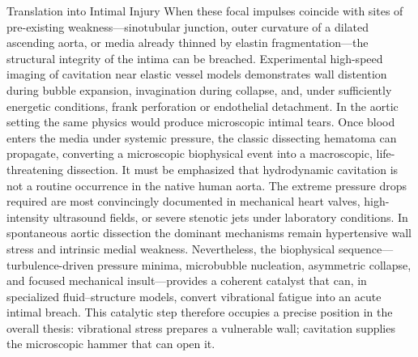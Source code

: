 Translation into Intimal Injury
When these focal impulses coincide with sites of pre-existing weakness—sinotubular junction, outer curvature of a dilated ascending aorta, or media already thinned by elastin fragmentation—the structural integrity of the intima can be breached. Experimental high-speed imaging of cavitation near elastic vessel models demonstrates wall distention during bubble expansion, invagination during collapse, and, under sufficiently energetic conditions, frank perforation or endothelial detachment. In the aortic setting the same physics would produce microscopic intimal tears. Once blood enters the media under systemic pressure, the classic dissecting hematoma can propagate, converting a microscopic biophysical event into a macroscopic, life-threatening dissection.
It must be emphasized that hydrodynamic cavitation is not a routine occurrence in the native human aorta. The extreme pressure drops required are most convincingly documented in mechanical heart valves, high-intensity ultrasound fields, or severe stenotic jets under laboratory conditions. In spontaneous aortic dissection the dominant mechanisms remain hypertensive wall stress and intrinsic medial weakness. Nevertheless, the biophysical sequence—turbulence-driven pressure minima, microbubble nucleation, asymmetric collapse, and focused mechanical insult—provides a coherent catalyst that can, in specialized fluid–structure models, convert vibrational fatigue into an acute intimal breach. This catalytic step therefore occupies a precise position in the overall thesis: vibrational stress prepares a vulnerable wall; cavitation supplies the microscopic hammer that can open it.

